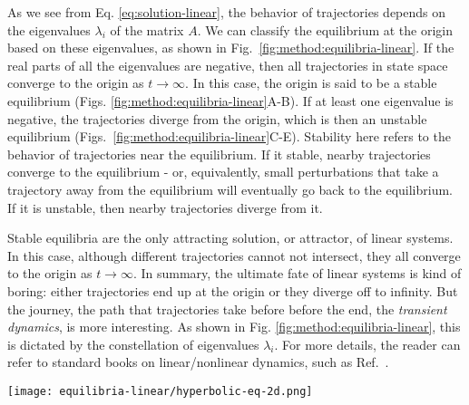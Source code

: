 As we see from Eq. \ref{eq:solution-linear}, the behavior of trajectories depends on the eigenvalues $\lambda_i$ of the matrix $A$. We can classify the equilibrium at the origin based on these eigenvalues, as shown in Fig.~\ref{fig:method:equilibria-linear}. If the real parts of all the eigenvalues are negative, then all trajectories in state space converge to the origin as $t \to \infty$. In this case, the origin is said to be a stable equilibrium (Figs. \ref{fig:method:equilibria-linear}A-B). If at least one eigenvalue is negative, the trajectories diverge from the origin, which is then an unstable equilibrium (Figs.~\ref{fig:method:equilibria-linear}C-E). Stability here refers to the behavior of trajectories near the equilibrium. If it stable, nearby trajectories converge to the equilibrium - or, equivalently, small perturbations that take a trajectory away from the equilibrium will eventually go back to the equilibrium. If it is unstable, then nearby trajectories diverge from it.


Stable equilibria are the only attracting solution, or attractor, of linear systems. In this case, although different trajectories cannot not intersect, they all converge to the origin as $t \to \infty$. %
In summary, the ultimate fate of linear systems is kind of boring: either trajectories end up at the origin or they diverge off to infinity. But the journey, the path that trajectories take before before the end, the \textit{transient dynamics}, is more interesting. As shown in Fig. \ref{fig:method:equilibria-linear}, this is dictated by the constellation of eigenvalues $\lambda_i$. For more details, the reader can refer to standard books on linear/nonlinear dynamics, such as Ref.~\cite{strogatz2002nonlinear}. 
%
\begin{figure*}
    \centering 
    \texttt{[image: equilibria-linear/hyperbolic-eq-2d.png]}
    \caption{\textbf{Hyperbolic equilibria in 2D linear systems}. The title specifies the number of eigenvalues that are purely real negative $r_-$ or positive $r_+$, or that are complex with real part negative $c_-$ or positive $c_+$. The first row shows equilibria whose eigenvalues are purely real, while the second one shows equilibria with complex eigenvalues. In the first column, the equilibria are stable - they are the two possible attractors in linear systems. In the second column, we have a saddle-point for purely real eigenvalues. In the third column, the equilibria are completely unstable, known as repellers.  }
    \label{fig:method:equilibria-linear}
\end{figure*}




